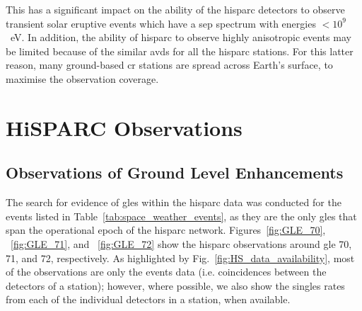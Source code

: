 This has a significant impact on the ability of the \gls{hisparc} detectors to observe transient solar eruptive events which have a \gls{sep} spectrum with energies $<10^9$~eV. In addition, the ability of \gls{hisparc} to observe highly anisotropic events may be limited because of the similar \glspl{avd} for all the \gls{hisparc} stations. For this latter reason, many ground-based \gls{cr} stations are spread across Earth's surface, to maximise the observation coverage.


\section{HiSPARC Observations}\label{sec:HS_obs}


\subsection{Observations of Ground Level Enhancements}

The search for evidence of \glspl{gle} within the \gls{hisparc} data was conducted for the events listed in Table~\ref{tab:space_weather_events}, as they are the only \glspl{gle} that span the operational epoch of the \gls{hisparc} network. Figures~\ref{fig:GLE_70}, ~\ref{fig:GLE_71}, and ~\ref{fig:GLE_72} show the \gls{hisparc} observations around \gls{gle} 70, 71, and 72, respectively. As highlighted by Fig.~\ref{fig:HS_data_availability}, most of the observations are only the events data (i.e. coincidences between the detectors of a station); however, where possible, we also show the singles rates from each of the individual detectors in a station, when available.

